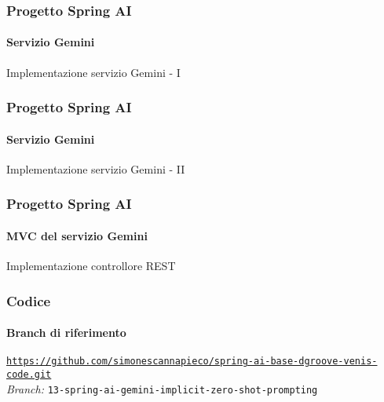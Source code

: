 %
\begin{frame}[t,fragile] \frametitle{Progetto Spring AI}
    \framesubtitle{Servizio Gemini}
		\vspace*{-.7cm}
        \begin{block}{Implementazione servizio Gemini - I}
            {\tiny}
    \end{block}
\end{frame}
%
\begin{frame}[t,fragile] \frametitle{Progetto Spring AI}
    \framesubtitle{Servizio Gemini}
    	\vspace*{-.7cm}
        \begin{block}{Implementazione servizio Gemini - II}
            {\tiny}
    \end{block}
\end{frame}
%
\begin{frame}[t,fragile] \frametitle{Progetto Spring AI}
    \framesubtitle{MVC del servizio Gemini}
    	\vspace*{-.7cm}
        \begin{block}{Implementazione controllore REST}
			{\tiny}
    	\end{block}
\end{frame}
%
\begin{frame}[fragile] \frametitle{Codice}
    \framesubtitle{Branch di riferimento}
	\begin{center}
		{\scriptsize \href{https://github.com/simonescannapieco/spring-ai-base-dgroove-venis-code.git}{\texttt{https://github.com/simonescannapieco/spring-ai-base-dgroove-venis-code.git}}}\\
		\textit{Branch:} \alert{\texttt{13-spring-ai-gemini-implicit-zero-shot-prompting}}
	\end{center}
\end{frame}